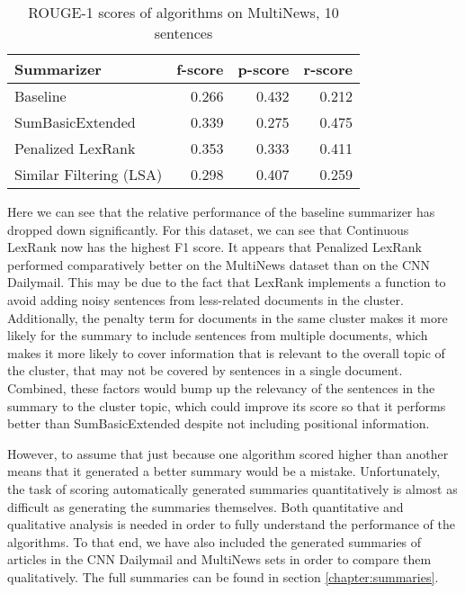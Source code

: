 \documentclass[../writeup.tex]{subfiles}
\begin{document}
\begin{table}[h]
    \centering
    \begin{tabular}{lrrr}
        \hline
        Summarizer              & f-score                       & p-score                       & r-score                       \\
        \hline
        Baseline                & 0.266                         & 0.432                         & 0.212                         \\
        SumBasicExtended        & 0.339                         & 0.275                         & \cellcolor[HTML]{F8FF00}0.475 \\
        Penalized LexRank       & \cellcolor[HTML]{F8FF00}0.353 & \cellcolor[HTML]{F8FF00}0.333 & 0.411                         \\
        Similar Filtering (LSA) & 0.298                         & 0.407                         & 0.259                         \\
        \hline
    \end{tabular}

    \caption{ROUGE-1 scores of algorithms on MultiNews, 10 sentences}
    \label{group:table:multi_compare}
\end{table}
Here we can see that the relative performance of the baseline summarizer has dropped down significantly.
For this dataset, we can see that Continuous LexRank now has the highest F1 score.
It appears that Penalized LexRank performed comparatively better on the MultiNews dataset than on the CNN Dailymail.
This may be due to the fact that LexRank implements a function to avoid adding noisy sentences from less-related documents in the cluster.
Additionally, the penalty term for documents in the same cluster makes it more likely for the summary to include sentences from multiple documents, which makes it more likely to cover information that is relevant to the overall topic of the cluster, that may not be covered by sentences in a single document.
Combined, these factors would bump up the relevancy of the sentences in the summary to the cluster topic, which could improve its score so that it performs better than SumBasicExtended despite not including positional information.

However, to assume that just because one algorithm scored higher than another means that it generated a better summary would be a mistake.
Unfortunately, the task of scoring automatically generated summaries quantitatively is almost as difficult as generating the summaries themselves.
Both quantitative and qualitative analysis is needed in order to fully understand the performance of the algorithms.
To that end, we have also included the generated summaries of articles in the CNN Dailymail and MultiNews sets in order to compare them qualitatively.
The full summaries can be found in section \ref{chapter:summaries}.
\end{document}
